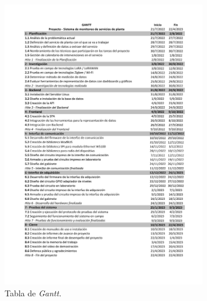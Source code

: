 \documentclass[
11pt%
]{charter}
\begin{document}


\begin{figure}[htpb]
\centering

\includegraphics[width=0.8\textwidth]{./Figuras/tablagantt.pdf}

\caption{Tabla de \textit{Gantt.}}
\label{fig:gantt1}
\end{figure}
\end{document}
